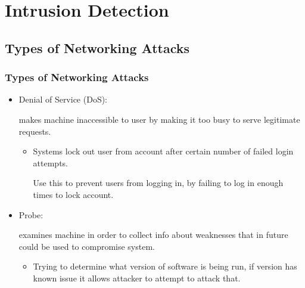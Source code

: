 \documentclass{beamer}
\newcommand{\linespace}{\vskip 0.25cm}
\begin{document}
\section[Intrusion Detection]{Intrusion Detection}
\subsection{Types of Networking Attacks}
\begin{frame}
  \frametitle{Types of Networking Attacks}
  \begin{itemize}
  	\item Denial of Service (DoS): 
  	
  	makes machine inaccessible to user by making it too busy to serve legitimate requests.
  	
  	\begin{itemize}
  		\item  Systems lock out user from account after certain number of failed login attempts. 
  		
  		Use this to prevent users from logging in, by failing to log in enough times to lock account.
  	\end{itemize}

  	\linespace
  	\linespace
  	
  	\item Probe: 
  	
  	examines machine in order to collect info about weaknesses that in future could be used to compromise system.
  	
  	\begin{itemize}
  		\item Trying to determine what version of software is being run, if version has known issue it allows attacker to attempt to attack that.
  	\end{itemize}
  \end{itemize}
\end{frame}
\end{document}
